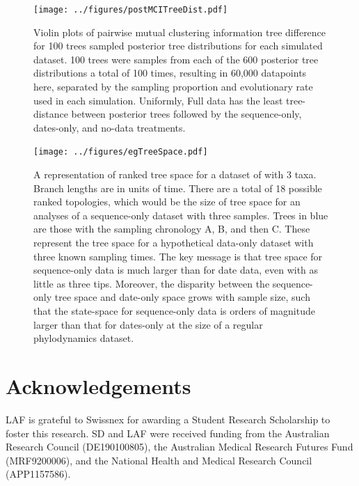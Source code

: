 \documentclass{article}
\begin{document}
\begin{figure}[H]
\centering
\texttt{[image: ../figures/postMCITreeDist.pdf]}
\caption{Violin plots of pairwise mutual clustering information tree difference for 100 trees sampled posterior tree distributions for each simulated dataset. 100 trees were samples from each of the 600 posterior tree distributions a total of 100 times, resulting in 60,000 datapoints here, separated by the sampling proportion and evolutionary rate used in each simulation. Uniformly, Full data has the least tree-distance between posterior trees followed by the sequence-only, dates-only, and no-data treatments.}
\label{fig:ptreeDist}
\end{figure}

\begin{figure}[H]
\centering
\texttt{[image: ../figures/egTreeSpace.pdf]}
\caption{A representation of ranked tree space for a dataset of with 3 taxa. Branch lengths are in units of time. There are a total of 18 possible ranked topologies, which would be the size of tree space for an analyses of a sequence-only dataset with three samples. Trees in blue are those with the sampling chronology A, B, and then C. These represent the tree space for a hypothetical data-only dataset with three known sampling times. The key message is that tree space for sequence-only data is much larger than for date data, even with as little as three tips. Moreover, the disparity between the sequence-only tree space and date-only space grows with sample size, such that the state-space for sequence-only data is orders of magnitude larger than that for dates-only at the size of a regular phylodynamics dataset.}
\label{fig:treeSpace}
\end{figure}

\section*{Acknowledgements}
LAF is grateful to Swissnex for awarding a Student Research Scholarship to foster this research. SD and LAF were received funding from the Australian Research Council (DE190100805), the Australian Medical Research Futures Fund (MRF9200006), and the National Health and Medical Research Council (APP1157586).
%
\end{document}
